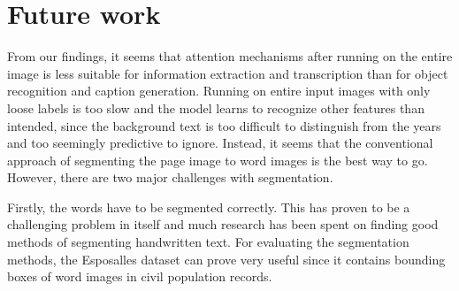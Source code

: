 


\section{Future work}

From our findings, it seems that attention mechanisms after running on the entire image is less suitable for information extraction and transcription than for object recognition and caption generation.
Running on entire input images with only loose labels is too slow and the model learns to recognize other features than intended, since the background text is too difficult to distinguish from the years and too seemingly predictive to ignore.
Instead, it seems that the conventional approach of segmenting the page image to word images is the best way to go. However, there are two major challenges with segmentation.

Firstly, the words have to be segmented correctly. This has proven to be a challenging problem in itself and much research has been spent on finding good methods of segmenting handwritten text. For evaluating the segmentation methods, the Esposalles dataset \cite{esposalles} can prove very useful since it contains bounding boxes of word images in civil population records.

